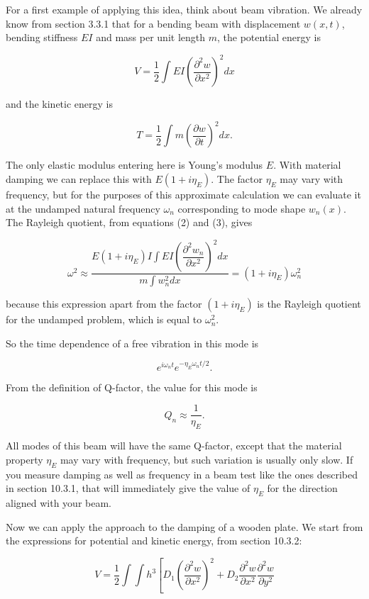   For a first example of applying this idea, think about beam vibration. We 
  already know from section 3.3.1 that for a bending beam with displacement 
  $w(x,t)$, bending stiffness $EI$ and mass per unit length $m$, the potential 
  energy is 

  $$ V = \dfrac{1}{2} \int{EI \left(\dfrac{\partial^2 w}{\partial x^2} 
  \right)^2 dx} \tag{2}$$ 

  and the kinetic energy is 

  $$T=\dfrac{1}{2} \int{ m \left(\dfrac{\partial w}{\partial t} \right)^2 dx } 
  . \tag{3}$$ 

  The only elastic modulus entering here is Young's modulus $E$. With material 
  damping we can replace this with $E(1+i \eta_E)$. The factor $\eta_E$ may 
  vary with frequency, but for the purposes of this approximate calculation we 
  can evaluate it at the undamped natural frequency $\omega_n$ corresponding to 
  mode shape $w_n(x)$. The Rayleigh quotient, from equations (2) and (3), gives 

  $$\omega^2 \approx \dfrac{E(1+i \eta_E) I \int{EI \left(\dfrac{\partial^2 
  w_n}{\partial x^2} \right)^2 dx}}{m \int{w_n^2 dx}}=(1+i \eta_E) \omega_n^2 
  \tag{4}$$ 

  because this expression apart from the factor $(1+i \eta_E)$ is the Rayleigh 
  quotient for the undamped problem, which is equal to $\omega_n^2$. 

  So the time dependence of a free vibration in this mode is 

  $$e^{i \omega_n t} e^{-\eta_E \omega_n t/2} . \tag{5}$$ 

  From the definition of Q-factor, the value for this mode is 

  $$Q_n \approx \dfrac{1}{\eta_E} . \tag{6}$$ 

  All modes of this beam will have the same Q-factor, except that the material 
  property $\eta_E$ may vary with frequency, but such variation is usually only 
  slow. If you measure damping as well as frequency in a beam test like the 
  ones described in section 10.3.1, that will immediately give the value of 
  $\eta_E$ for the direction aligned with your beam. 

  Now we can apply the approach to the damping of a wooden plate. We start from 
  the expressions for potential and kinetic energy, from section 10.3.2: 

  $$ V = \dfrac{1}{2} \int{\int{h^3 \left[ D_1 \left(\dfrac{\partial^2 
  w}{\partial x^2} \right)^2 + D_2 \dfrac{\partial^2 w}{\partial x^2} 
  \dfrac{\partial^2 w}{\partial y^2} \right. }} $$ 

